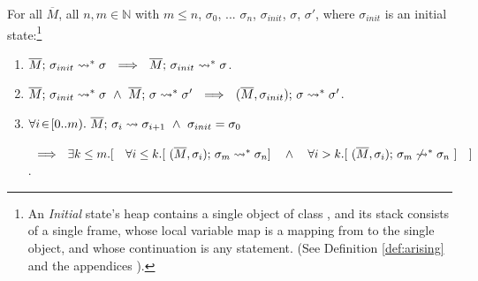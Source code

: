 { \begin{lemma}
\label{lemma:orig:to:bounded}
For all $\overline M$, all $n,m\in \mathbb{N}$ with $m\leq n$, $\sigma_0$, ... $\sigma_n$,  $\sigma_{init}$, $\sigma$, $\sigma'$, where
$\sigma_{init}$ is an initial state:\footnote{An \emph{Initial} state's heap contains a single object of class , and
its  stack   consists of a single frame, whose local variable map is a mapping from  to the single object, and whose continuation is  any statement.
(See Definition %
\ref{def:arising} and the 
{appendices %
\cite{necessityFull}).}} 
\begin{enumerate} 
\item 
\label{otbOne}
$\overline{M};\, \sigma_{init} \leadsto^* {\sigma}\ \ \Longrightarrow\ \  \overline{M};\, {\sigma_{init}} \rightsquigarrow^* \sigma$.
\item 
\label{otbTwo}
$\overline{M};\, \sigma_{init} \leadsto^* {\sigma}\ \wedge\ \overline{M};\, \sigma \leadsto^* {\sigma'}\ \ \Longrightarrow\ \  (\overline{M}, \sigma_{init});\, {\sigma} \rightsquigarrow^* \sigma'$.
\item
\label{otbThree}
 $\forall i\!\in\! [0..m).\ \overline{M};\, \sigma_{i} \leadsto {\sigma_{i+1}}\ \wedge\ \sigma_{init}=\sigma_0$ \\
\strut \hspace{0.5cm} $\ \ \Longrightarrow \ \  \exists k\leq m.[\ \ \ \forall i\leq k.[\  %
\leadstoBoundedStarThree  {\Mtwo}  {\sigma_m}  {\sigma_{i}} {\sigma_n} ]\ \ \  \wedge \ \ \ 
 \forall i> k. [\  \notLeadstoBoundedStarThree  {\Mtwo}  {\sigma_m}  {\sigma_{i}} {\sigma_n}\ ] \ \ \ ]$.
\end{enumerate} 
\end{lemma}
 



 
}

